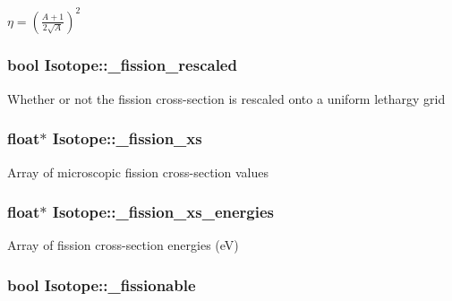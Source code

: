 $ \eta = \left(\frac{A+1}{2\sqrt{A}}\right)^2 $ \hypertarget{classIsotope_ad1517dc6fb03724d33fc40dee7ba6132}{
\subsubsection[{\-\_\-fission\-\_\-rescaled}]{\setlength{\rightskip}{0pt plus 5cm}bool Isotope\-::\-\_\-fission\-\_\-rescaled\hspace{0.3cm}{\ttfamily [private]}}}\label{classIsotope_ad1517dc6fb03724d33fc40dee7ba6132}
Whether or not the fission cross-\/section is rescaled onto a uniform lethargy grid \hypertarget{classIsotope_a721d2479a71910c0b49b4620cecb3ac6}{
\subsubsection[{\-\_\-fission\-\_\-xs}]{\setlength{\rightskip}{0pt plus 5cm}float$\ast$ Isotope\-::\-\_\-fission\-\_\-xs\hspace{0.3cm}{\ttfamily [private]}}}\label{classIsotope_a721d2479a71910c0b49b4620cecb3ac6}
Array of microscopic fission cross-\/section values \hypertarget{classIsotope_a03dc2cba22e9f2617df7e373cafb475a}{
\subsubsection[{\-\_\-fission\-\_\-xs\-\_\-energies}]{\setlength{\rightskip}{0pt plus 5cm}float$\ast$ Isotope\-::\-\_\-fission\-\_\-xs\-\_\-energies\hspace{0.3cm}{\ttfamily [private]}}}\label{classIsotope_a03dc2cba22e9f2617df7e373cafb475a}
Array of fission cross-\/section energies (e\-V) \hypertarget{classIsotope_a4eaec9fe7e44e88193720dd6ef8d0eb1}{
\subsubsection[{\-\_\-fissionable}]{\setlength{\rightskip}{0pt plus 5cm}bool Isotope\-::\-\_\-fissionable\hspace{0.3cm}{\ttfamily [private]}}}\label{classIsotope_a4eaec9fe7e44e88193720dd6ef8d0eb1}
